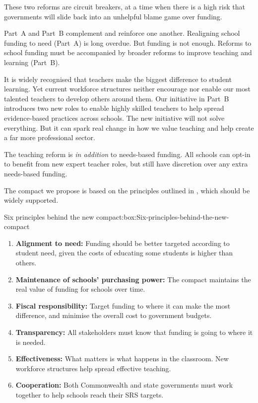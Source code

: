 \documentclass{grattan}
\begin{document}
These two reforms are circuit breakers, at a time when there is a high risk that governments will slide back into an unhelpful blame game over funding.

Part~A and Part~B complement and reinforce one another.
Realigning school funding to need (Part~A) is long overdue.
But funding is not enough.
Reforms to school funding must be accompanied by broader reforms to improve teaching and learning (Part~B).

It is widely recognised that teachers make the biggest difference to student learning.
Yet current workforce structures neither encourage nor enable our most talented teachers to develop others around them.
Our initiative in Part~B introduces two new roles to enable highly skilled teachers to help spread evidence-based practices across schools.
The new initiative will not solve everything.
But it can spark real change in how we value teaching and help create a far more professional sector.

The teaching reform is \emph{in addition} to needs-based funding. All schools can opt-in to benefit from new expert teacher roles, but still have discretion over any extra needs-based funding.

The compact we propose is based on the principles outlined in , which should be widely supported.

\begin{verysmallbox}{Six principles behind the new compact:}{box:Six-principles-behind-the-new-compact}
\begin{enumerate}[leftmargin=1.7em]
\item \textbf{Alignment to need:}
Funding should be better targeted according to student need, given the costs of educating some students is higher than others.

\item \textbf{Maintenance of schools' purchasing power:}
The compact maintains the real value of funding for schools over time.

\item \textbf{Fiscal responsibility:} Target funding to where it can make the most difference, and minimise the overall cost to government budgets.

\item \textbf{Transparency:}
All stakeholders must know that funding is going to where it is needed.

\item \textbf{Effectiveness:}
What matters is what happens in the classroom. New workforce structures help spread effective teaching.

\item \textbf{Cooperation:} Both Commonwealth and state governments must work together to help schools reach their SRS targets.
\end{enumerate}
\end{verysmallbox}
\end{document}
